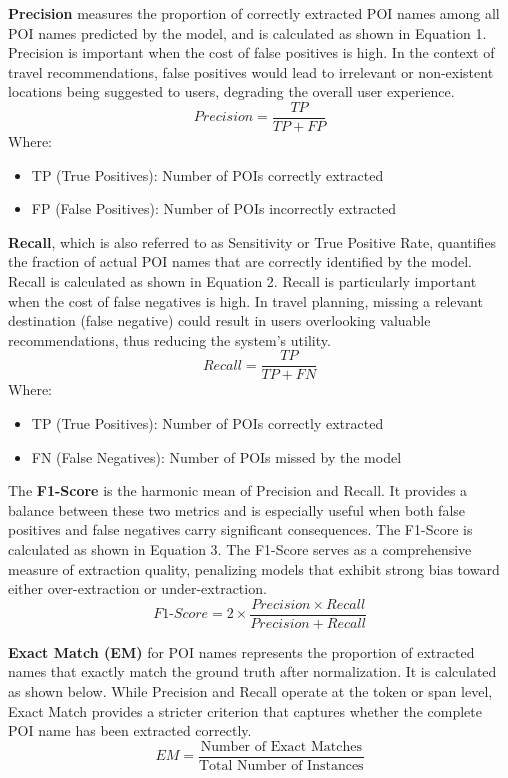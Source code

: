 \documentclass[a4paper,12pt]{report}
\begin{document}
\textbf{Precision} measures the proportion of correctly extracted POI names among all POI names predicted by the model, and is calculated as shown in Equation 1. Precision is important when the cost of false positives is high. In the context of travel recommendations, false positives would lead to irrelevant or non-existent locations being suggested to users, degrading the overall user experience.
\begin{equation}
Precision = \frac{TP}{TP+FP}
\end{equation}
Where:
\begin{itemize}
    \item TP (True Positives): Number of POIs correctly extracted
    \item FP (False Positives): Number of POIs incorrectly extracted
\end{itemize}

\textbf{Recall}, which is also referred to as Sensitivity or True Positive Rate, quantifies the fraction of actual POI names that are correctly identified by the model. Recall is calculated as shown in Equation 2. Recall is particularly important when the cost of false negatives is high. In travel planning, missing a relevant destination (false negative) could result in users overlooking valuable recommendations, thus reducing the system's utility.
\begin{equation}
Recall = \frac{TP}{TP+FN}
\end{equation}
Where:
\begin{itemize}
    \item TP (True Positives): Number of POIs correctly extracted
    \item FN (False Negatives): Number of POIs missed by the model
\end{itemize}

The \textbf{F1-Score} is the harmonic mean of Precision and Recall. It provides a balance between these two metrics and is especially useful when both false positives and false negatives carry significant consequences. The F1-Score is calculated as shown in Equation 3. The F1-Score serves as a comprehensive measure of extraction quality, penalizing models that exhibit strong bias toward either over-extraction or under-extraction.
\begin{equation}
F1\text{-}Score = 2 \times \frac{Precision \times Recall}{Precision + Recall}
\end{equation}

\textbf{Exact Match (EM)} for POI names represents the proportion of extracted names that exactly match the ground truth after normalization. It is calculated as shown below. While Precision and Recall operate at the token or span level, Exact Match provides a stricter criterion that captures whether the complete POI name has been extracted correctly.
\begin{equation}
EM = \frac{\text{Number of Exact Matches}}{\text{Total Number of Instances}}
\end{equation}
\end{document}
